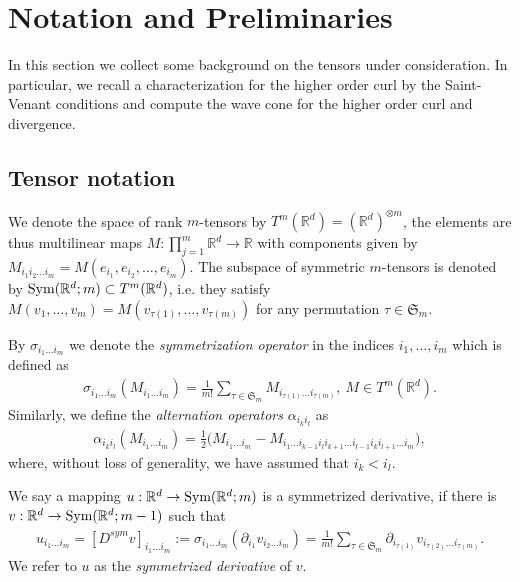 \documentclass[a4paper, 10pt, twoside, notitlepage]{amsart}
\theoremstyle{plain}
\newcommand{\R}{\mathbb{R}}
\newcommand{\p}{\partial}
\renewcommand{\S}[1]{\textup{Sym}(\R^d;#1)}
\begin{document}
	
	
	\section{Notation and Preliminaries}
	\label{sec:notation}
	
	In this section we collect some background on the tensors under consideration. In particular, we recall a characterization for the higher order curl by the Saint-Venant
	conditions and compute the wave cone for the higher order curl and divergence.
	
	\subsection{Tensor notation}
	\label{sec:tensors}
	
	We denote the space of rank $m$-tensors by $T^m(\R^d) = (\R^d)^{\otimes m}$, the elements are thus multilinear maps $M:\prod_{j=1}^m \R^d \to \R$ 
	with components given by $M_{i_1 i_2 \dots i_m} = M(e_{i_1},e_{i_2},\dots,e_{i_m})$.  The subspace of symmetric $m$-tensors is denoted by $\S{m} \subset T^m(\R^d)$, i.e. they satisfy
	$M(v_1,\dots,v_m) = M(v_{\tau(1)},\dots,v_{\tau(m)})$ for any permutation $\tau \in \mathfrak{S}_m$.
	
	By $\sigma_{i_1 \dots i_m}$ we denote the \emph{symmetrization operator} in the indices $i_1,\dots,i_m$ which is defined as
	\begin{align*}
		\sigma_{i_1 \dots i_m}(M_{i_1 \dots i_m}) = \frac{1}{m!} \sum_{\tau \in \mathfrak{S}_m} M_{i_{\tau(1)} \dots i_{\tau(m)}}, \ M \in T^m(\R^d).
	\end{align*}
	Similarly, we define the \emph{alternation operators} $\alpha_{i_k i_l}$ as
	\begin{align}
	\label{eq:antisym}
		\alpha_{i_k i_l} (M_{i_1 \dots i_m}) = \frac{1}{2} \Big(M_{i_1 \dots i_m} - M_{i_1 \dots i_{k-1} i_l i_{k+1} \dots i_{l-1} i_k i_{l+1} \dots i_m}\Big),
	\end{align}
	where, without loss of generality, we have assumed that $i_k < i_l$.
	
	We say a mapping $u: \R^d \to \S{m}$ is a symmetrized derivative, if there is $v: \R^d \to \S{m-1}$ such that
	\begin{align}\label{eq:potential}
		u_{i_1\dots i_m} = [D^{sym} v]_{i_1 \dots i_m}:= \sigma_{i_1 \dots i_m}( \p_{i_1} v_{i_2 \dots i_m}) = \frac{1}{m!} \sum_{\tau \in \mathfrak{S}_m} \p_{i_{\tau(1)}} v_{i_{\tau(2)} \dots i_{\tau(m)}}.
	\end{align}
	We refer to $u$ as the \emph{symmetrized derivative} of $v$.
	
\end{document}
